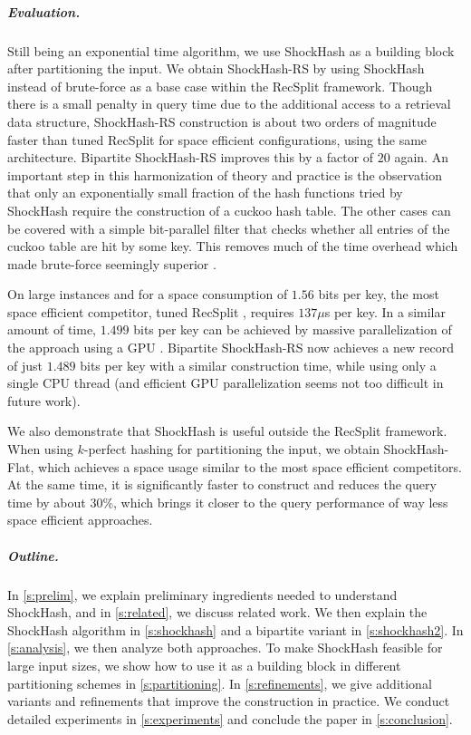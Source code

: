 \documentclass[a4paper,USenglish,cleveref]{lipics-v2021}
\newcommand{\myparagraph}[1]{\subparagraph*{#1}}
\begin{document}
\myparagraph{Evaluation.}
Still being an exponential time algorithm, we use ShockHash as a building block after partitioning the input.
We obtain ShockHash-RS by using ShockHash instead of brute-force as a base case within the RecSplit framework.
Though there is a small penalty in query time due to the additional access to a retrieval data structure, ShockHash-RS construction is about two orders of magnitude faster than tuned RecSplit \cite{bez2023high} for space efficient configurations, using the same architecture.
Bipartite ShockHash-RS improves this by a factor of $20$ again.
An important step in this harmonization of theory and practice is the observation that only an exponentially small fraction of the hash functions tried by ShockHash require the construction of a cuckoo hash table.
The other cases can be covered with a simple bit-parallel filter that checks whether all entries of the cuckoo table are hit by some key.
This removes much of the time overhead which made brute-force seemingly superior \cite{bez2023high}.

On large instances and for a space consumption of $1.56$ bits per key, the most space efficient competitor, tuned RecSplit \cite{bez2023high}, requires $137\mu$s per key.
In a similar amount of time, $1.499$ bits per key can be achieved by massive parallelization of the approach using a GPU \cite{bez2023high}.
Bipartite ShockHash-RS now achieves a new record of just $1.489$ bits per key with a similar construction time, while using only a single CPU thread (and efficient GPU parallelization seems not too difficult in future work).

We also demonstrate that ShockHash is useful outside the RecSplit framework.
When using $k$-perfect hashing for partitioning the input, we obtain ShockHash-Flat, which achieves a space usage similar to the most space efficient competitors.
At the same time, it is significantly faster to construct and reduces the query time by about 30\%, which brings it closer to the query performance of way less space efficient approaches.

\myparagraph{Outline.}
In \cref{s:prelim}, we explain preliminary ingredients needed to understand ShockHash, and in \cref{s:related}, we discuss related work.
We then explain the ShockHash algorithm in \cref{s:shockhash} and a bipartite variant in \cref{s:shockhash2}.
In \cref{s:analysis}, we then analyze both approaches.
To make ShockHash feasible for large input sizes, we show how to use it as a building block in different partitioning schemes in \cref{s:partitioning}.
In \cref{s:refinements}, we give additional variants and refinements that improve the construction in practice.
We conduct detailed experiments in \cref{s:experiments} and conclude the paper in \cref{s:conclusion}.
\end{document}
